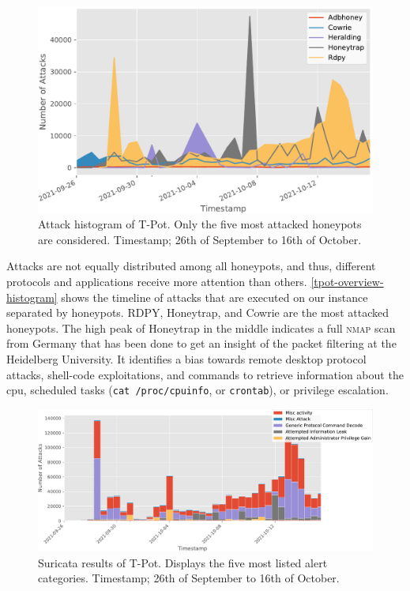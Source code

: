 \begin{figure}
    \centering
    \includegraphics[width=\textwidth]{figures/tpot-attacks-histogram.pdf}
    \caption[Attack histogram of T-Pot]{
        Attack histogram of T-Pot.
        Only the five most attacked honeypots are considered.
        Timestamp; 26th of September to 16th of October.
    }
    \label{tpot-overview-histogram}
\end{figure}

Attacks are not equally distributed among all honeypots, and thus, different protocols and applications receive more attention than others.
\autoref{tpot-overview-histogram} shows the timeline of attacks that are executed on our instance separated by honeypots.
RDPY, Honeytrap, and Cowrie are the most attacked honeypots.
The high peak of Honeytrap in the middle indicates a full \textsc{nmap} scan from Germany that has been done to get an insight of the packet filtering at the Heidelberg University.
It identifies a bias towards remote desktop protocol attacks, shell-code exploitations, and commands to retrieve information about the \ac{cpu}, scheduled tasks (\verb|cat /proc/cpuinfo|, or \verb|crontab|), or privilege escalation.

\begin{figure}
    \centering
    \includegraphics[width=\textwidth]{figures/tpot-suricata-alerts.pdf}
    \caption[Suricata results of T-Pot]{
        Suricata results of T-Pot.
        Displays the five most listed alert categories.
        Timestamp; 26th of September to 16th of October.
    }
    \label{fig:suricata-results}
\end{figure}

